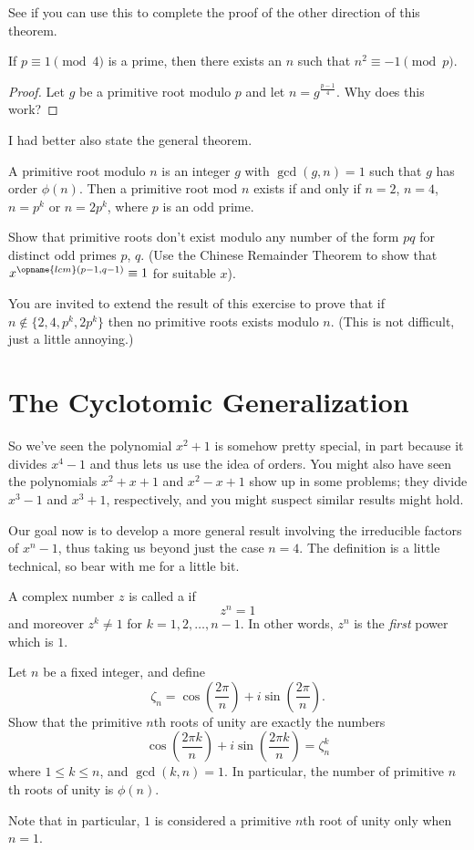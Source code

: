\documentclass[11pt]{scrartcl}
\begin{document}
See if you can use this to complete the proof of the other direction of this theorem.
\begin{proposition}
  If $p \equiv 1 \pmod 4$ is a prime, then there exists an $n$ such that
  $n^2 \equiv -1 \pmod p$.
\end{proposition}
\begin{proof}
  Let $g$ be a primitive root modulo $p$ and let $n = g^{\frac{p-1}{4}}$.
  Why does this work?
\end{proof}

I had better also state the general theorem.
\begin{theorem}
  A primitive root modulo $n$ is an integer $g$ with $\gcd(g,n) = 1$
  such that $g$ has order $\phi(n)$.
  Then a primitive root mod $n$
  exists if and only if $n=2$, $n=4$, $n=p^k$ or $n=2p^k$,
  where $p$ is an odd prime.
\end{theorem}
\begin{exercise}
  Show that primitive roots don't exist modulo any number of the form $pq$
  for distinct odd primes $p$, $q$.
  (Use the Chinese Remainder Theorem to show that $x^{\opname{lcm}(p-1,q-1)} \equiv 1$
  for suitable $x$).
\end{exercise}
You are invited to extend the result of this exercise to prove that if $n \notin \{2,4,p^k,2p^k\}$
then no primitive roots exists modulo $n$. (This is not difficult, just a little annoying.)

\section{The Cyclotomic Generalization}
So we've seen the polynomial $x^2+1$ is somehow pretty special, in part
because it divides $x^4-1$ and thus lets us use the idea of orders.
You might also have seen the polynomials $x^2+x+1$ and $x^2-x+1$ show up in some problems; they divide $x^3-1$ and $x^3+1$, respectively, and you might suspect similar results might hold.

Our goal now is to develop a more general result involving the irreducible
factors of $x^n-1$, thus taking us beyond just the case $n=4$.
The definition is a little technical, so bear with me for a little bit.
\begin{definition}
  A complex number $z$ is called a  if
  \[ z^n = 1 \]
  and moreover $z^k \neq 1$ for $k=1,2,\dots,n-1$.
  In other words, $z^n$ is the \emph{first} power which is $1$.
\end{definition}
\begin{exercise}
  Let $n$ be a fixed integer, and define
  \[ \zeta_n = \cos \left( \frac{2\pi}{n} \right) + i \sin\left( \frac{2\pi}{n} \right). \]
  Show that the primitive $n$th roots of unity are exactly the numbers
  \[ \cos \left( \frac{2\pi k}{n} \right) + i \sin \left( \frac{2\pi k}{n} \right) = \zeta_n^k \]
  where $1 \le k \le n$, and $\gcd(k,n) = 1$.
  In particular, the number of primitive $n$th roots of unity is $\phi(n)$.
\end{exercise}
Note that in particular, $1$ is considered a primitive $n$th root of unity only when $n=1$.
\end{document}
